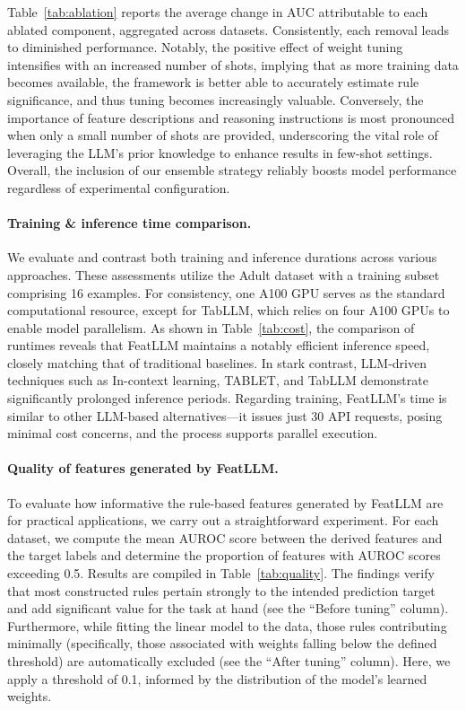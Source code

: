 Table~\ref{tab:ablation} reports the average change in AUC attributable to each ablated component, aggregated across datasets. Consistently, each removal leads to diminished performance. Notably, the positive effect of weight tuning intensifies with an increased number of shots, implying that as more training data becomes available, the framework is better able to accurately estimate rule significance, and thus tuning becomes increasingly valuable. Conversely, the importance of feature descriptions and reasoning instructions is most pronounced when only a small number of shots are provided, underscoring the vital role of leveraging the LLM's prior knowledge to enhance results in few-shot settings. Overall, the inclusion of our ensemble strategy reliably boosts model performance regardless of experimental configuration.

\vspace*{-0.12in}
\paragraph{Training \& inference time comparison.} We evaluate and contrast both training and inference durations across various approaches. These assessments utilize the Adult dataset with a training subset comprising 16 examples. For consistency, one A100 GPU serves as the standard computational resource, except for TabLLM, which relies on four A100 GPUs to enable model parallelism. As shown in Table~\ref{tab:cost}, the comparison of runtimes reveals that \textsf{FeatLLM} maintains a notably efficient inference speed, closely matching that of traditional baselines. In stark contrast, LLM-driven techniques such as In-context learning, TABLET, and TabLLM demonstrate significantly prolonged inference periods. Regarding training, \textsf{FeatLLM}'s time is similar to other LLM-based alternatives—it issues just 30 API requests, posing minimal cost concerns, and the process supports parallel execution.

\vspace*{-0.12in}
\paragraph{Quality of features generated by \textsf{FeatLLM}.}
To evaluate how informative the rule-based features generated by \textsf{FeatLLM} are for practical applications, we carry out a straightforward experiment. For each dataset, we compute the mean AUROC score between the derived features and the target labels and determine the proportion of features with AUROC scores exceeding 0.5. Results are compiled in Table~\ref{tab:quality}. The findings verify that most constructed rules pertain strongly to the intended prediction target and add significant value for the task at hand (see the “Before tuning” column). Furthermore, while fitting the linear model to the data, those rules contributing minimally (specifically, those associated with weights falling below the defined threshold) are automatically excluded (see the “After tuning” column). Here, we apply a threshold of 0.1, informed by the distribution of the model’s learned weights.

